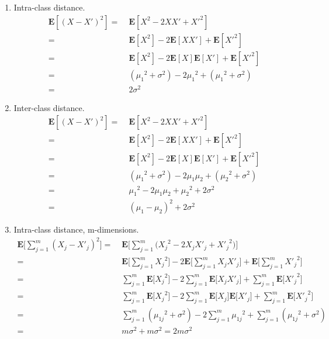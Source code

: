 \documentclass[english]{article}
\newcommand{\E}{\mathbf{E}}
\begin{document}
\begin{enumerate}
\item Intra-class distance.
  \begin{align*}
    \E[(X - X')^2] =&\; \E[X^2 - 2XX' + X'^2] \\
    =&\; \E[X^2] - 2\E[XX'] +\E[X'^2] \\
    =&\; \E[X^2] - 2\E[X]\E[X'] +\E[X'^2] \\
     =&\; ({\mu_1}^2 + \sigma^2) - 2{\mu_1}^2 + ({\mu_1}^2 + \sigma^2) \\
     =&\; 2\sigma^2
  \end{align*}

\item Inter-class distance.
  \begin{align*}
    \E[(X - X')^2] =&\; \E[X^2 - 2XX' + X'^2] \\
    =&\; \E[X^2] - 2\E[XX'] +\E[X'^2] \\
    =&\; \E[X^2] - 2\E[X]\E[X'] +\E[X'^2] \\
     =&\; ({\mu_1}^2 + \sigma^2) - 2{\mu_1}{\mu_2} + ({\mu_2}^2 + \sigma^2) \\
     =&\; {\mu_1}^2 - 2{\mu_1}{\mu_2} + {\mu_2}^2 + 2\sigma^2 \\
     =&\; (\mu_1 - \mu_2)^2 + 2\sigma^2
  \end{align*}

\item Intra-class distance, m-dimensions.
  \begin{align*}
    \E\bigg[\sum_{j=1}^m (X_{j} - X'_{j})^2\bigg] =&\; \E\bigg[\sum_{j=1}^m\big({X_{j}}^2 - 2X_{j}X'_{j} + {X'_{j}}^2\big)\bigg] \\
    =&\; \E\bigg[\sum_{j=1}^m {X_{j}}^2\bigg] - 2\E\bigg[\sum_{j=1}^m X_{j}X'_{j}\bigg] + \E\bigg[\sum_{j=1}^m {X'_{j}}^2\bigg] \\
    =&\; \sum_{j=1}^m\E\big[ {X_{j}}^2\big] - 2\sum_{j=1}^m\E\big[ X_{j}X'_{j}\big] + \sum_{j=1}^m\E\big[ {X'_{j}}^2\big] \\
    =&\; \sum_{j=1}^m\E\big[ {X_{j}}^2\big] - 2\sum_{j=1}^m\E\big[ X_{j}\big]\E\big[X'_{j}\big] + \sum_{j=1}^m\E\big[ {X'_{j}}^2\big] \\
    =&\; \sum_{j=1}^m({\mu_{1j}}^2 + \sigma^2) - 2\sum_{j=1}^m {\mu_{1j}}^2 + \sum_{j=1}^m({\mu_{1j}}^2 + \sigma^2) \\
    =&\; m\sigma^2 +  m\sigma^2 = 2m\sigma^2 \\
  \end{align*}


\end{enumerate}
\end{document}
